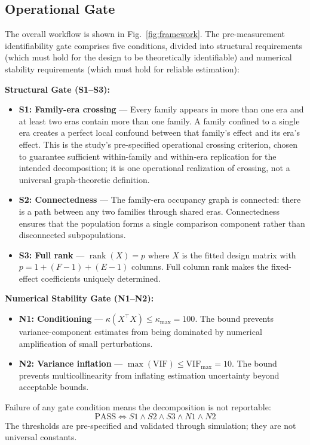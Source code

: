 \documentclass[11pt]{article}
\theoremstyle{definition}
\theoremstyle{plain}
\begin{document}
\subsection{Operational Gate}
The overall workflow is shown in Fig.~\ref{fig:framework}. The pre-measurement identifiability gate comprises five conditions, divided into structural requirements (which must hold for the design to be theoretically identifiable) and numerical stability requirements (which must hold for reliable estimation):

\textbf{Structural Gate (S1--S3):}
\begin{itemize}
\item \textbf{S1: Family-era crossing} --- Every family appears in more than one era and at least two eras contain more than one family. A family confined to a single era creates a perfect local confound between that family's effect and its era's effect. This is the study's pre-specified operational crossing criterion, chosen to guarantee sufficient within-family and within-era replication for the intended decomposition; it is one operational realization of crossing, not a universal graph-theoretic definition.
\item \textbf{S2: Connectedness} --- The family-era occupancy graph is connected: there is a path between any two families through shared eras. Connectedness ensures that the population forms a single comparison component rather than disconnected subpopulations.
\item \textbf{S3: Full rank} --- $\operatorname{rank}(X) = p$ where $X$ is the fitted design matrix with $p = 1 + (F-1) + (E-1)$ columns. Full column rank makes the fixed-effect coefficients uniquely determined.
\end{itemize}

\textbf{Numerical Stability Gate (N1--N2):}
\begin{itemize}
\item \textbf{N1: Conditioning} --- $\kappa(X^\top X) \leq \kappa_{\max} = 100$. The bound prevents variance-component estimates from being dominated by numerical amplification of small perturbations.
\item \textbf{N2: Variance inflation} --- $\max(\text{VIF}) \leq \text{VIF}_{\max} = 10$. The bound prevents multicollinearity from inflating estimation uncertainty beyond acceptable bounds.
\end{itemize}

Failure of any gate condition means the decomposition is not reportable:
\[
\boxed{\text{PASS} \iff S1 \land S2 \land S3 \land N1 \land N2}
\]
The thresholds are pre-specified and validated through simulation; they are not universal constants.
\end{document}
